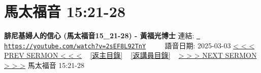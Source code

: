 \documentclass{book}
\begin{document}
\section{馬太福音 15:21-28}
\label{sec:2sEF8L92TnY}
\textbf{腓尼基婦人的信心 (馬太福音15\_21-28) - 黃福光博士}
\newline
\newline
連結: \href{https://youtube.com/watch?v=2sEF8L92TnY}{\texttt{ https://youtube.com/watch?v=2sEF8L92TnY}} ~~~~ 語音日期: 2025-03-03 
\newline
\newline
\hyperref[sec:lTGVgidxHms]{< < < PREV SERMON < < <}
~
\hyperlink{toc}{[返主目錄]}
~
\hyperref[ch:preacher14]{[返講員目錄]}
~
\hyperref[sec:499K9je19EI]{> > > NEXT SERMON > > >}
\newline
\newline
馬太福音 15:21-28
\newline
\end{document}

